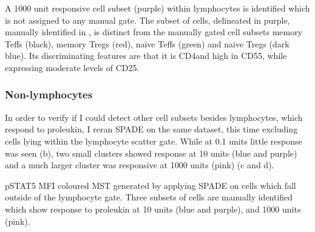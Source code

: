 { A 1000 unit responsive cell subset (purple) within lymphocytes is identified which is not assigned to any manual gate.  }
{
  The subset of cells, delineated in purple, manually identified in ,
  is distinct from the manually gated cell subsets memory Teffs (black), memory Tregs (red), naive Teffs (green) and naive Tregs (dark blue).
  Its discriminating features are that it is CD4\negative and high in CD55, while expressing moderate levels of CD25.
}

\clearpage

\subsubsection{Non-lymphocytes}

In order to verify if I could detect other cell subsets besides lymphocytes, which respond to proleukin,
I reran \gls{SPADE} on the same dataset, this time excluding cells lying within the lymphocyte scatter gate.
While at 0.1 units little response was seen (b),
two small clusters showed response at 10 units (blue and purple) and a much larger cluster was responsive at 1000 units (pink)
(c and d).

{pSTAT5 MFI coloured \gls{MST} generated by applying \gls{SPADE} on cells which fall outside of the lymphocyte gate.}
{
  Three subsets of cells are manually identified which show response to proleukin at 10 units (blue and purple),
  and 1000 units (pink).
}
% 

